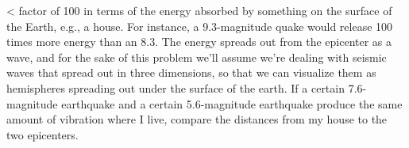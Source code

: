  <%
factor of 100 in terms of the energy absorbed by something
on the surface of the Earth, e.g., a house. For instance, a
9.3-magnitude quake would release 100 times more energy than
an 8.3. The energy spreads out from the epicenter as a wave,
and for the sake of this problem we'll assume we're dealing
with seismic waves that spread out in three dimensions, so
that we can visualize them as hemispheres spreading out
under the surface of the earth. If a certain 7.6-magnitude
earthquake and a certain 5.6-magnitude earthquake produce
the same amount of vibration where I live, compare the
distances from my house to the two epicenters.
